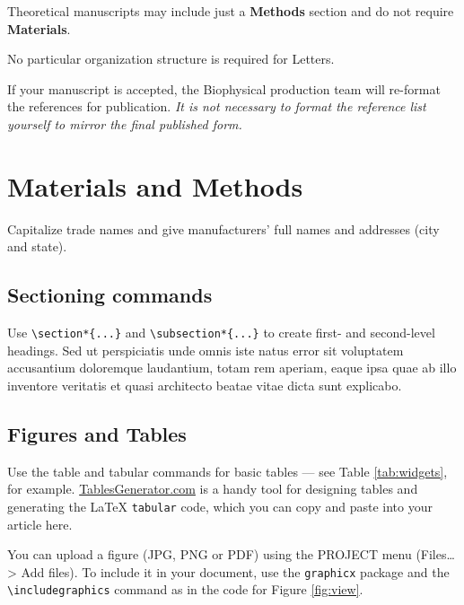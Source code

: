 \documentclass{biophys-new}
\begin{document}
Theoretical manuscripts may include just a \textbf{Methods} section and do not require \textbf{Materials}.

No particular organization structure is required for Letters.

If your manuscript is accepted, the Biophysical production team will re-format the references for publication. \emph{It is not necessary to format the reference list yourself to mirror the final published form.}

\section*{Materials and Methods}

Capitalize trade names and give manufacturers' full names and addresses (city and state). 


\subsection*{Sectioning commands}

Use \verb|\section*{...}| and \verb|\subsection*{...}| to create first- and second-level headings. Sed ut perspiciatis unde omnis iste natus error sit voluptatem accusantium doloremque laudantium, totam rem aperiam, eaque ipsa quae ab illo inventore veritatis et quasi architecto beatae vitae dicta sunt explicabo. 

\subsection*{Figures and Tables}

Use the table and tabular commands for basic tables --- see Table \ref{tab:widgets}, for example. \href{http://tablesgenerator.com}{TablesGenerator.com} is a handy tool for designing tables and generating the \LaTeX{} \texttt{tabular} code, which you can copy and paste into your article here.

You can upload a figure (JPG, PNG or PDF) using the PROJECT menu (Files\ldots > Add files). To include it in your document, use the \verb|graphicx| package and the \verb|\includegraphics| command as in the code for Figure \ref{fig:view}. 
\end{document}
